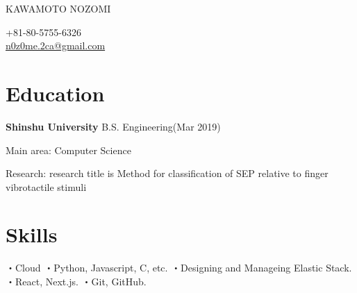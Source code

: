 \documentclass[10pt]{article} %
\begin{document}

\parbox[top][0.12\textheight][c]{\linewidth}{ %
	\vspace{-0.04\textheight} %
	{\color{name}\Huge KAWAMOTO NOZOMI}\\\medskip %
}

\begin{paracol}{2} %

{\faPhone} +81-80-5755-6326 \\ %
{\small\faEnvelope} \hspace{5mm} \href{mailto:n0z0me.2ca@gmail.com}{\small n0z0me.2ca@gmail.com} \\ %

\section{\Large Education}
\textbf{Shinshu University}
B.S. Engineering(Mar 2019)

Main area: Computer Science

Research: research title is Method for classification of SEP relative to finger vibrotactile stimuli

\section{\Large Skills}
・Cloud 
・Python, Javascript, C, etc.
・Designing and Manageing Elastic Stack.
・React, Next.js.
・Git, GitHub.

\switchcolumn %


\end{paracol}
\end{document}

